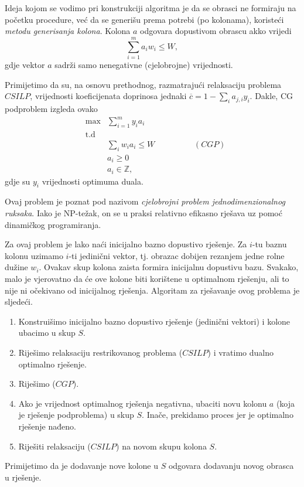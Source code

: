 \documentclass[b5paper, utf8, 11pt, colorlinks]{book}
\theoremstyle{definition}
\begin{document}
 
 Ideja kojom se vodimo pri konstrukciji algoritma je da se obrasci ne formiraju na početku procedure, već da se generišu prema potrebi (po kolonama), koristeći \emph{metodu generisanja kolona}. Kolona $a$ odgovara dopustivom obrascu akko vrijedi 
 $$ \sum_{i=1}^m a_i w_i \leq W,$$
 gdje vektor $a$ sadrži samo nenegativne (cjelobrojne) vrijednosti. 
 
Primijetimo da su, na osnovu prethodnog, razmatrajući relaksaciju problema  $CSILP$, vrijednosti koeficijenata doprinosa 
jednaki $\overline{c} = 1 - \sum_{i} a_{j,i} y_i$.  
 Dakle, CG podproblem izgleda ovako
$$ \begin{array}{lll}
     &\max& \sum_{i=1}^m y_i a_i \\
     & \mbox{t.d}& \\
     &  &\sum_{i} w_i a_i \leq W \hspace{2cm} (CGP)\\
     & &a_i \geq 0 \\
     & &a_i \in \mathbb{Z},
 \end{array}$$
  gdje su $y_i$ vrijednosti optimuma duala. 
  
 
 Ovaj problem je poznat pod nazivom \emph{cjelobrojni problem jednodimenzionalnog ruksaka}. Iako je NP-težak, on se u praksi relativno efikasno rješava  uz pomoć dinamičkog programiranja. 
 

 Za ovaj problem je lako naći inicijalno bazno dopustivo rješenje.
 Za $i$-tu baznu kolonu uzimamo $i$-ti jedinični vektor, tj. obrazac dobijen rezanjem jedne rolne dužine $w_i$. Ovakav skup kolona zaista formira inicijalnu dopustivu bazu. Svakako, malo je vjerovatno da će ove kolone biti korištene u optimalnom rješenju, ali to nije ni očekivano od inicijalnog rješenja. 
 Algoritam za rješavanje ovog problema je sljedeći.
 \begin{enumerate}
     \item Konstruišimo inicijalno bazno dopustivo rješenje (jedinični vektori) i kolone ubacimo u skup $S$.
     \item Riješimo relaksaciju restrikovanog problema ($CSILP$) i vratimo dualno optimalno rješenje. 
     \item Riješimo ($CGP$).
     \item Ako je vrijednost optimalnog rješenja negativna, ubaciti novu kolonu $a$ (koja je rješenje podproblema) u skup $S$. Inače, prekidamo proces jer je optimalno rješenje nađeno. 
     \item Riješiti relaksaciju ($CSILP$) na novom skupu kolona $S$.
 \end{enumerate}
 Primijetimo da je dodavanje nove kolone u $S$ odgovara dodavanju novog obrasca u rješenje. 
 
\end{document}
